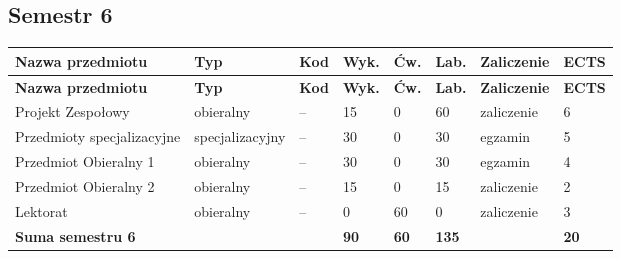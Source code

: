 \documentclass[12pt,a4paper]{article}
\newcommand{\thdrule}{\noalign{\global\setlength{\extrarowheight}{0pt}}}
\newcommand{\thdend}{\noalign{\global\setlength{\extrarowheight}{4pt}}}
\begin{document}
\subsection*{Semestr 6}

{\scriptsize
\begin{longtable}{m{5.0cm}m{1.9cm}m{0.75cm}m{0.85cm}m{0.85cm}m{0.85cm}m{1.45cm}m{0.9cm}}
\thdrule\toprule
\rowcolor{pjatkRed}
{\color{white}\footnotesize\textbf{\vphantom{Ag}Nazwa przedmiotu}} & {\color{white}\footnotesize\textbf{\vphantom{Ag}Typ}} & {\color{white}\footnotesize\textbf{\vphantom{Ag}Kod}} & {\color{white}\footnotesize\textbf{\vphantom{Ag}Wyk.}} & {\color{white}\footnotesize\textbf{\vphantom{Ag}Ćw.}} & {\color{white}\footnotesize\textbf{\vphantom{Ag}Lab.}} & {\color{white}\footnotesize\textbf{\vphantom{Ag}Zaliczenie}} & {\color{white}\footnotesize\textbf{\vphantom{Ag}ECTS}} \\
\midrule\thdend
\endfirsthead
\thdrule\toprule
\rowcolor{pjatkRed}
{\color{white}\footnotesize\textbf{\vphantom{Ag}Nazwa przedmiotu}} & {\color{white}\footnotesize\textbf{\vphantom{Ag}Typ}} & {\color{white}\footnotesize\textbf{\vphantom{Ag}Kod}} & {\color{white}\footnotesize\textbf{\vphantom{Ag}Wyk.}} & {\color{white}\footnotesize\textbf{\vphantom{Ag}Ćw.}} & {\color{white}\footnotesize\textbf{\vphantom{Ag}Lab.}} & {\color{white}\footnotesize\textbf{\vphantom{Ag}Zaliczenie}} & {\color{white}\footnotesize\textbf{\vphantom{Ag}ECTS}} \\
\midrule\thdend
\endhead
\rowcolor{tableElective} Projekt Zespołowy & {\scriptsize obieralny} & -- & 15 & 0 & 60 & {\scriptsize zaliczenie} & 6 \\
\rowcolor{tableElective} Przedmioty specjalizacyjne & {\scriptsize specjalizacyjny} & -- & 30 & 0 & 30 & {\scriptsize egzamin} & 5 \\
\rowcolor{tableElective} Przedmiot Obieralny 1 & {\scriptsize obieralny} & -- & 30 & 0 & 30 & {\scriptsize egzamin} & 4 \\
\rowcolor{tableElective} Przedmiot Obieralny 2 & {\scriptsize obieralny} & -- & 15 & 0 & 15 & {\scriptsize zaliczenie} & 2 \\
\rowcolor{tableElective} Lektorat & {\scriptsize obieralny} & -- & 0 & 60 & 0 & {\scriptsize zaliczenie} & 3 \\
\midrule[\heavyrulewidth]
\rowcolor{tableSummary} \textbf{Suma semestru 6} & & & \textbf{90} & \textbf{60} & \textbf{135} & & \textbf{20} \\
\bottomrule
\end{longtable}}
\end{document}
